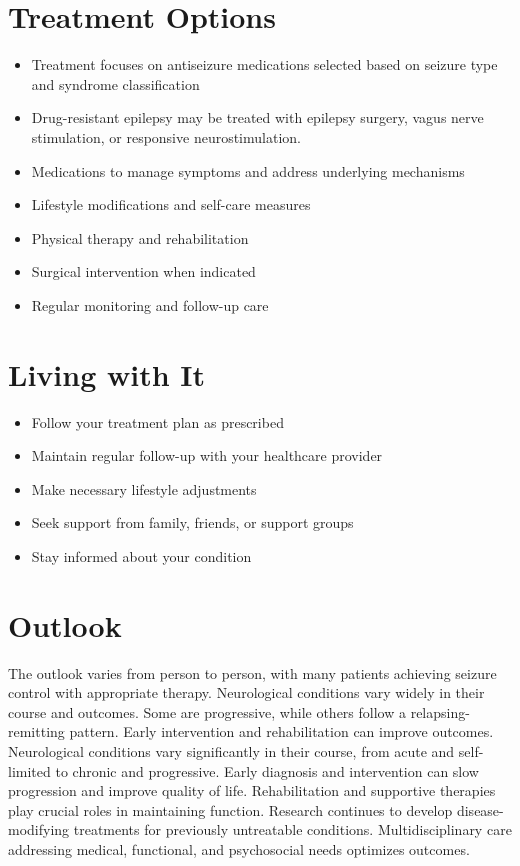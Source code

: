 \section{Treatment Options}
\begin{itemize}[noitemsep]
  \item Treatment focuses on antiseizure medications selected based on seizure type and syndrome classification
  \item Drug-resistant epilepsy may be treated with epilepsy surgery, vagus nerve stimulation, or responsive neurostimulation.
  \item Medications to manage symptoms and address underlying mechanisms
  \item Lifestyle modifications and self-care measures
  \item Physical therapy and rehabilitation
  \item Surgical intervention when indicated
  \item Regular monitoring and follow-up care
\end{itemize}
\section{Living with It}
\begin{itemize}[noitemsep]
  \item Follow your treatment plan as prescribed
  \item Maintain regular follow-up with your healthcare provider
  \item Make necessary lifestyle adjustments
  \item Seek support from family, friends, or support groups
  \item Stay informed about your condition
\end{itemize}
\section{Outlook}
The outlook varies from person to person, with many patients achieving seizure control with appropriate therapy. Neurological conditions vary widely in their course and outcomes. Some are progressive, while others follow a relapsing-remitting pattern. Early intervention and rehabilitation can improve outcomes. Neurological conditions vary significantly in their course, from acute and self-limited to chronic and progressive. Early diagnosis and intervention can slow progression and improve quality of life. Rehabilitation and supportive therapies play crucial roles in maintaining function. Research continues to develop disease-modifying treatments for previously untreatable conditions. Multidisciplinary care addressing medical, functional, and psychosocial needs optimizes outcomes.
